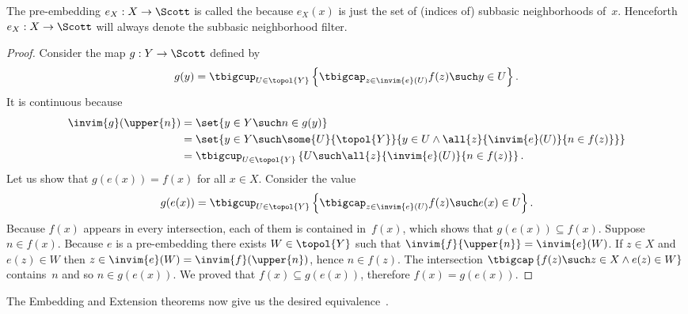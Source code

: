 \noindent
%
The pre-embedding $e_X : X \to \Scott$ is called the  because $e_X(x)$ is just the set of (indices
of) subbasic neighborhoods of~$x$. Henceforth $e_X : X \to \Scott$
will always denote the subbasic neighborhood filter.


\begin{proof}
  Consider the map $g : Y \to \Scott$ defined by
  \begin{equation*}
    g(y) = \tbigcup_{U \in \topol{Y}} \left\{
      \tbigcap_{z \in \invim{e}(U)} f(z)
      \such
      y \in U
    \right\}.
  \end{equation*}
  It is continuous because
  \begin{align*}
    \invim{g}(\upper{n}) &=
    \set{y \in Y \such n \in g(y)} \\
    &=
    \set{y \in Y \such \some{U}{
        \topol{Y}}{y \in U \land
        \all{z}{\invim{e}(U)}{n \in f(z)}
      }
    } \\
    &=
    \tbigcup_{U \in \topol{Y}} \left\{
        U \such
        \all{z}{\invim{e}(U)}{n \in f(z)}
      \right\}.
  \end{align*}
  Let us show that $g(e(x)) = f(x)$ for all $x \in X$. Consider the
  value
  \begin{align*}
    g(e(x)) =
    \tbigcup_{U \in \topol{Y}} \left\{
      \tbigcap_{z \in \invim{e}(U)} f(z)
      \such
      e(x) \in U \right\}.
  \end{align*}
  Because $f(x)$ appears in every intersection, each of them is
  contained in~$f(x)$, which shows that $g(e(x)) \subseteq f(x)$.
  Suppose $n \in f(x)$. Because $e$ is a pre-embedding there exists $W
  \in \topol{Y}$ such that $\invim{f}{\upper{n}} = \invim{e}(W)$. If
  $z \in X$ and $e(z) \in W$ then $z \in \invim{e}(W) =
  \invim{f}(\upper{n})$, hence $n \in f(z)$. The intersection
  $\tbigcap \left\{f(z) \such z \in X \land e(z) \in W \right\}$
  contains~$n$ and so $n \in g(e(x))$. We proved that $f(x) \subseteq
  g(e(x))$, therefore $f(x) = g(e(x))$.
\end{proof}

\noindent
%
The Embedding and Extension theorems now give us the desired
equivalence~.

